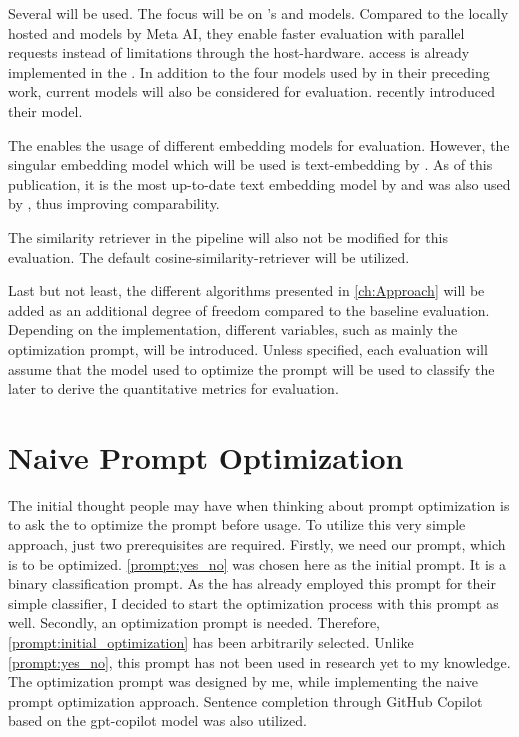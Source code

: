 Several \LLMs will be used.
The focus will be on \OAI's \gpt and \gptmini models.
Compared to the locally hosted \codellama and \llama models by Meta AI, they enable faster evaluation with parallel requests instead of limitations through the host-hardware.
\API access is already implemented in the \LiSSAf.
In addition to the four models used by  in their preceding work, current models will also be considered for evaluation.
\OAI recently introduced their \gptf model.

The \LiSSAf enables the usage of different embedding models for evaluation.
However, the singular embedding model which will be used is \ac{text-embedding} by \OAI.
As of this publication, it is the most up-to-date text embedding model by \OAI and was also used by \citeauthor{hey2025RequirementsTraceability}, thus improving comparability.

The similarity retriever in the \LiSSA pipeline will also not be modified for this evaluation.
The default cosine-similarity-retriever will be utilized.

Last but not least, the different \APE algorithms presented in \autoref{ch:Approach} will be added as an additional degree of freedom compared to the baseline evaluation.
Depending on the implementation, different variables, such as mainly the optimization prompt, will be introduced.
Unless specified, each evaluation will assume that the model used to optimize the prompt will be used to classify the \TLs later to derive the quantitative metrics for evaluation.


\section{Naive Prompt Optimization}
\label{sec:Evaluation:naive_optimization}

The initial thought people may have when thinking about prompt optimization is to ask the \LLM to optimize the prompt before usage.
To utilize this very simple approach, just two prerequisites are required.
Firstly, we need our prompt, which is to be optimized.
\autoref{prompt:yes_no} was chosen here as the initial prompt.
It is a \KISS binary classification prompt.
As the \LiSSAf has already employed this prompt for their simple classifier, I decided to start the optimization process with this prompt as well.
Secondly, an optimization prompt is needed.
Therefore, \autoref{prompt:initial_optimization} has been arbitrarily selected.
Unlike \autoref{prompt:yes_no}, this prompt has not been used in research yet to my knowledge.
The optimization prompt was designed by me, while implementing the naive prompt optimization approach.
Sentence completion through GitHub Copilot based on the \ac{gpt-copilot} model was also utilized.

